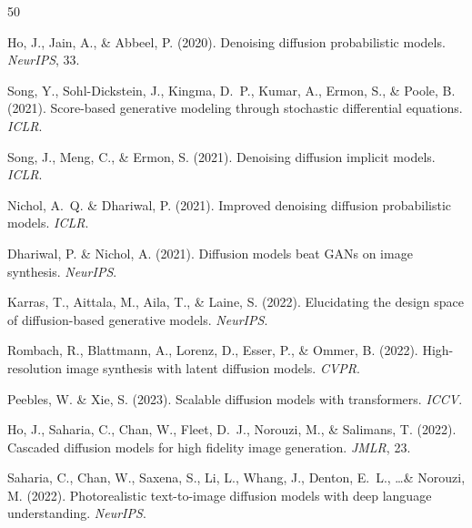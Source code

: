 \documentclass[10pt]{article}
\begin{document}

% 
% 

\begin{thebibliography}{50}

Ho, J., Jain, A., \& Abbeel, P. (2020).
\newblock Denoising diffusion probabilistic models.
\newblock \emph{NeurIPS}, 33.

Song, Y., Sohl-Dickstein, J., Kingma, D.~P., Kumar, A., Ermon, S., \& Poole, B. (2021).
\newblock Score-based generative modeling through stochastic differential equations.
\newblock \emph{ICLR}.

Song, J., Meng, C., \& Ermon, S. (2021).
\newblock Denoising diffusion implicit models.
\newblock \emph{ICLR}.

Nichol, A.~Q. \& Dhariwal, P. (2021).
\newblock Improved denoising diffusion probabilistic models.
\newblock \emph{ICLR}.

Dhariwal, P. \& Nichol, A. (2021).
\newblock Diffusion models beat GANs on image synthesis.
\newblock \emph{NeurIPS}.

Karras, T., Aittala, M., Aila, T., \& Laine, S. (2022).
\newblock Elucidating the design space of diffusion-based generative models.
\newblock \emph{NeurIPS}.

Rombach, R., Blattmann, A., Lorenz, D., Esser, P., \& Ommer, B. (2022).
\newblock High-resolution image synthesis with latent diffusion models.
\newblock \emph{CVPR}.

Peebles, W. \& Xie, S. (2023).
\newblock Scalable diffusion models with transformers.
\newblock \emph{ICCV}.

Ho, J., Saharia, C., Chan, W., Fleet, D.~J., Norouzi, M., \& Salimans, T. (2022).
\newblock Cascaded diffusion models for high fidelity image generation.
\newblock \emph{JMLR}, 23.

Saharia, C., Chan, W., Saxena, S., Li, L., Whang, J., Denton, E.~L., \ldots \& Norouzi, M. (2022).
\newblock Photorealistic text-to-image diffusion models with deep language understanding.
\newblock \emph{NeurIPS}.


\end{thebibliography}
\end{document}
